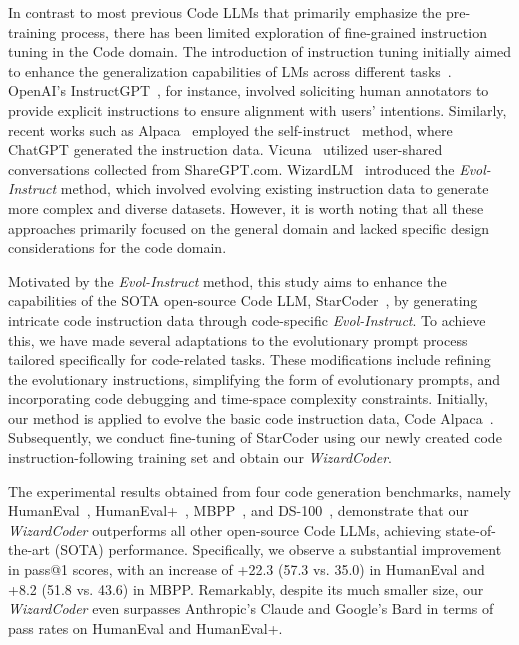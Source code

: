\documentclass{article}
\newcommand{\name}{\emph{Evol-Instruct}}
\newcommand{\modelname}{\emph{WizardCoder}}
\begin{document}
In contrast to most previous Code LLMs that primarily emphasize the pre-training process, there has been limited exploration of fine-grained instruction tuning in the Code domain. The introduction of instruction tuning initially aimed to enhance the generalization capabilities of LMs across different tasks~\cite{t5,DBLP:conf/iclr/WeiBZGYLDDL22,flan-t5,ExT5,T0,ZeroPrompt,UnifiedQA}. OpenAI's InstructGPT~\cite{DBLP:conf/nips/Ouyang0JAWMZASR22}, for instance, involved soliciting human annotators to provide explicit instructions to ensure alignment with users' intentions. Similarly, recent works such as Alpaca~\cite{alpaca} employed the self-instruct~\cite{wang2022self} method, where ChatGPT generated the instruction data. Vicuna~\cite{vicuna2023} utilized user-shared conversations collected from ShareGPT.com. WizardLM~\cite{xu2023wizardlm} introduced the \name{} method, which involved evolving existing instruction data to generate more complex and diverse datasets. However, it is worth noting that all these approaches primarily focused on the general domain and lacked specific design considerations for the code domain.

Motivated by the \name{} method, this study aims to enhance the capabilities of the SOTA open-source Code LLM, StarCoder~\cite{li2023starcoder}, by generating intricate code instruction data through code-specific \name{}. To achieve this, we have made several adaptations to the evolutionary prompt process tailored specifically for code-related tasks. These modifications include refining the evolutionary instructions, simplifying the form of evolutionary prompts, and incorporating code debugging and time-space complexity constraints. Initially, our method is applied to evolve the basic code instruction data, Code Alpaca~\cite{codealpaca}. Subsequently, we conduct fine-tuning of StarCoder using our newly created code instruction-following training set and obtain our \modelname{}.

The experimental results obtained from four code generation benchmarks, namely HumanEval~\cite{humeval}, HumanEval+~\cite{humanevalp}, MBPP~\cite{MBPP}, and DS-100~\cite{DS1000}, demonstrate that our \modelname{} outperforms all other open-source Code LLMs, achieving state-of-the-art (SOTA) performance. Specifically, we observe a substantial improvement in pass@1 scores, with an increase of +22.3 (57.3 vs. 35.0) in HumanEval and +8.2 (51.8 vs. 43.6) in MBPP. Remarkably, despite its much smaller size, our \modelname{} even surpasses Anthropic's Claude and Google's Bard in terms of pass rates on HumanEval and HumanEval+.
\end{document}
